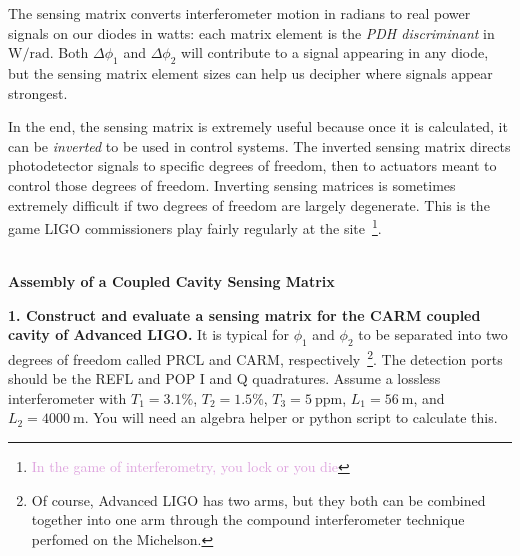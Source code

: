 \documentclass[11pt]{article}
\begin{document}
The sensing matrix converts interferometer motion in radians 
to real power signals on our diodes in watts: each matrix element is the \textit{PDH discriminant} in $\mathrm{W/rad}$.
Both $\Delta \phi_1$ and $\Delta \phi_2$ will contribute to a signal appearing in any diode, but the sensing matrix element sizes can help us decipher where signals appear strongest.

In the end, the sensing matrix is extremely useful because once it is calculated, 
it can be \textit{inverted} to be used in control systems.
The inverted sensing matrix directs photodetector signals to specific degrees of freedom, then to actuators meant to control those degrees of freedom.
Inverting sensing matrices is sometimes extremely difficult if two degrees of freedom are largely degenerate.
This is the game LIGO commissioners play fairly regularly at the site~\textcolor{Plum}{\footnote{\textcolor{Plum}{In the game of interferometry, you lock or you die}}}.


\noindent~\\
\textbf{Assembly of a Coupled Cavity Sensing Matrix}

\textbf{1. Construct and evaluate a sensing matrix for the CARM coupled cavity of Advanced LIGO.} 
It is typical for $\phi_1$ and $\phi_2$ to be separated into two degrees of freedom called PRCL and CARM, respectively~\textcolor{OliveGreen}{\footnote{\textcolor{OliveGreen}{Of course, Advanced LIGO has two arms, but they both can be combined together into one arm through the compound interferometer technique perfomed on the Michelson.}}}.  
The detection ports should be the REFL and POP I and Q quadratures.
Assume a lossless interferometer with $T_1 = 3.1\%$, $T_2 = 1.5\%$, $T_3 = 5~\mathrm{ppm}$, $L_1 = 56~\mathrm{m}$, and $L_2 = 4000~\mathrm{m}$.
You will need an algebra helper or python script to calculate this.
\end{document}
